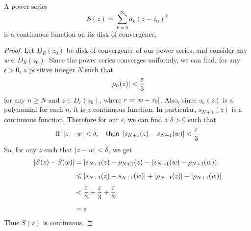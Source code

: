 \begin{theorem}\label{contpowerseries}
A power series
\[S(z) = \sum_{k=0}^\infty a_k(z - z_0)^k\]
is a continuous function on its disk of convergence. 
\end{theorem}
\begin{proof}
Let $D_R(z_0)$ be disk of convergence of our power series, and consider any $w \in D_R(z_0)$. Since the power series converges uniformly, we can find, for any $\epsilon > 0$, a positive integer $N$ such that \[\left\lvert\rho_n(z)\right\rvert < \frac{\varepsilon}{3}\] for any $n \geq N$ and $z \in D_r(z_0)$, where $r = \left\lvert w - z_0\right\rvert$. Also, since $s_n(z)$ is a polynomial for each $n$, it is a continuous function. In particular, $s_{N + 1}(z)$ is a continuous function. Therefore for our $\epsilon$, we can find a $\delta > 0$ such that
\[\text{if } \left\lvert z - w\right\rvert< \delta,\quad \text{then } \left\lvert s_{N+1}(z) - s_{N+1}(w)\right\rvert< \frac{\varepsilon}{3}\]
So, for any $z$ such that $\left\lvert z - w\right\rvert < \delta$, we get
\begin{align*}
\left\lvert S(z) - S(w)\right\rvert &= \left\lvert s_{N+1}(z) + \rho_{N+1}(z) - (s_{N+1}(w) - \rho_{N+1}(w))\right\rvert\\[0.5em]
 &\leqslant \left\lvert s_{N+1}(z) - s_{N+1}(w)\right\rvert + \left\lvert\rho_{N+1}(z)\right\rvert + \left\lvert\rho_{N+1}(w)\right\rvert\\[0.5em]
 &< \frac{\varepsilon}{3} + \frac{\varepsilon}{3} + \frac{\varepsilon}{3}\\[0.5em]
 &= \varepsilon
\end{align*}
Thus $S(z)$ is continuous.
\end{proof}


